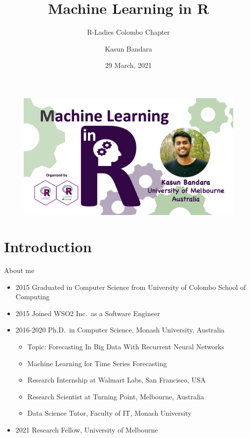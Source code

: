 \documentclass[12pt,ignorenonframetext,]{beamer}
\title[]{Machine Learning in R}
\subtitle{R-Ladies Colombo Chapter}
\author[
        Kasun Bandara
    ]{Kasun Bandara}
\institute[
    ]{
    Melbourne Centre for Data Science, University of Melbourne, Australia.
    }
\date[
      29 March, 2021
  ]{
      29 March, 2021
        }
\providecommand{\tightlist}{%
  \setlength{\itemsep}{0pt}\setlength{\parskip}{0pt}}
\begin{document}
  \begin{frame}[plain]
  \titlepage
  \end{frame}



\begin{frame}

\begin{figure}
\includegraphics[scale=0.22]{images/kasun}
\end{figure}

\end{frame}

\hypertarget{introduction}{%
\section{Introduction}\label{introduction}}

\begin{frame}{About me}
\protect\hypertarget{about-me}{}

\begin{itemize}
\tightlist
\item
  2015 Graduated in Computer Science from University of Colombo School
  of Computing
\item
  2015 Joined WSO2 Inc.~as a Software Engineer
\item
  2016-2020 Ph.D.~in Computer Science, Monash University, Australia

  \begin{itemize}
  \tightlist
  \item
    Topic: Forecasting In Big Data With Recurrent Neural Networks
  \item
    Machine Learning for Time Series Forecasting
  \item
    Research Internship at Walmart Labs, San Francisco, USA
  \item
    Research Scientist at Turning Point, Melbourne, Australia
  \item
    Data Science Tutor, Faculty of IT, Monash University
  \end{itemize}
\item
  2021 Research Fellow, University of Melbourne
\end{itemize}

\end{frame}
\end{document}
